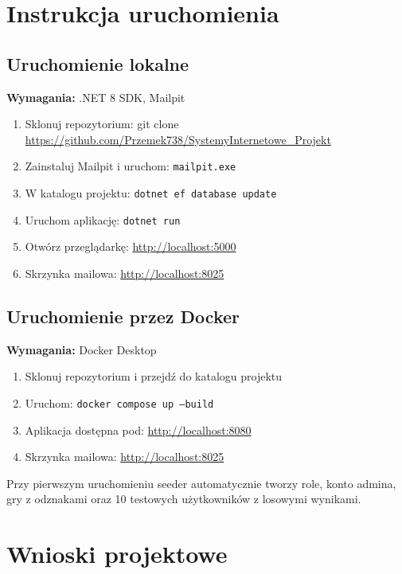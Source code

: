 \documentclass[12pt,a4paper]{article}
\newcommand{\code}[1]{\texttt{\small#1}}
\begin{document}
\section{Instrukcja uruchomienia}

\subsection{Uruchomienie lokalne}

\textbf{Wymagania:} .NET 8 SDK, Mailpit

\begin{enumerate}[leftmargin=1.5cm]
  \item Sklonuj repozytorium: git clone \url{https://github.com/Przemek738/SystemyInternetowe_Projekt}
  \item Zainstaluj Mailpit i uruchom: \code{mailpit.exe}
  \item W katalogu projektu: \code{dotnet ef database update}
  \item Uruchom aplikację: \code{dotnet run}
  \item Otwórz przeglądarkę: \url{http://localhost:5000}
  \item Skrzynka mailowa: \url{http://localhost:8025}
\end{enumerate}

\subsection{Uruchomienie przez Docker}

\textbf{Wymagania:} Docker Desktop

\begin{enumerate}[leftmargin=1.5cm]
  \item Sklonuj repozytorium i przejdź do katalogu projektu
  \item Uruchom: \code{docker compose up --build}
  \item Aplikacja dostępna pod: \url{http://localhost:8080}
  \item Skrzynka mailowa: \url{http://localhost:8025}
\end{enumerate}

Przy pierwszym uruchomieniu seeder automatycznie tworzy role, konto admina, gry z odznakami
oraz 10 testowych użytkowników z losowymi wynikami.

\section{Wnioski projektowe}
\end{document}
